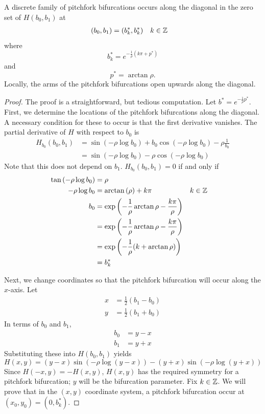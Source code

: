 \documentclass[thesis.tex]{subfiles}
\begin{document}
\begin{lemma}\label{pitchforkH}
A discrete family of pitchfork bifurcations occurs along the diagonal in the zero set of $H(b_0, b_1)$ at 
\begin{align*}
(b_0, b_1) &= (b_k^*, b_k^*) && k \in \mathbb{Z}
\end{align*}
where 
\begin{equation}\label{pkstar}
b^*_k = e^{-\frac{1}{\rho} (k \pi + p^*) }
\end{equation}
and 
\begin{equation}\label{pstar}
p^* = \arctan \rho.
\end{equation}
Locally, the arms of the pitchfork bifurcations open upwards along the diagonal.
\begin{proof}
The proof is a straightforward, but tedious computation. Let $b^* = e^{-\frac{1}{\rho} p^*}$. First, we determine the locations of the pitchfork bifurcations along the diagonal. A necessary condition for these to occur is that the first derivative vanishes. The partial derivative of $H$ with respect to $b_0$ is
\begin{align*}
H_{b_0}(b_0, b_1) &= 
\sin \left( -\rho \log b_0 \right)
+ b_0 \cos \left( - \rho \log b_0 \right)- \rho \frac{1}{b_0} \\
&= \sin \left( - \rho \log b_0 \right) - \rho \cos \left( - \rho \log b_0 \right)
\end{align*}
Note that this does not depend on $b_1$. $H_{b_0}(b_0, b_1) = 0$ if and only if
\begin{align*}
\tan \left( -\rho \log b_0 \right) &=  \rho \\
-\rho \log b_0 &= \arctan \left( \rho\right) + k \pi && k \in \mathbb{Z} \\ 
b_0 &= \mathop\mathrm{exp}\nolimits \left( -\frac{1}{\rho} \arctan \rho - \frac{k \pi}{\rho} \right) \\
&= \mathop\mathrm{exp}\nolimits \left( -\frac{1}{\rho} \arctan \rho - \frac{k \pi}{\rho} \right)  \\
&= \mathop\mathrm{exp}\nolimits \left( -\frac{1}{\rho} (k + \arctan \rho) \right) \\
&= b_k^*
\end{align*}

Next, we change coordinates so that the pitchfork bifurcation will occur along the $x$-axis. Let
\begin{align*}
x &= \frac{1}{2}(b_1 - b_0) \\
y &= \frac{1}{2}(b_1 + b_0)
\end{align*}
In terms of $b_0$ and $b_1$,
\begin{align*}
b_0 &= y - x \\
b_1 &= y + x
\end{align*}
Substituting these into $H(b_0, b_1)$ yields
\begin{equation}\label{Hxy}
H(x, y) = 
(y - x) \sin \left( -\rho \log(y - x) \right) - (y + x) \sin \left( - \rho \log (y + x) \right)
\end{equation}
Since $H(-x, y) = -H(x, y)$, $H(x,y)$ has the required symmetry for a pitchfork bifurcation; $y$ will be the bifurcation parameter. Fix $k \in \mathbb{Z}$. We will prove that in the $(x,y)$ coordinate system, a pitchfork bifurcation occur at $(x_0, y_0) = \left(0, b^*_k \right)$.


\end{proof}
\end{lemma}
\end{document}
